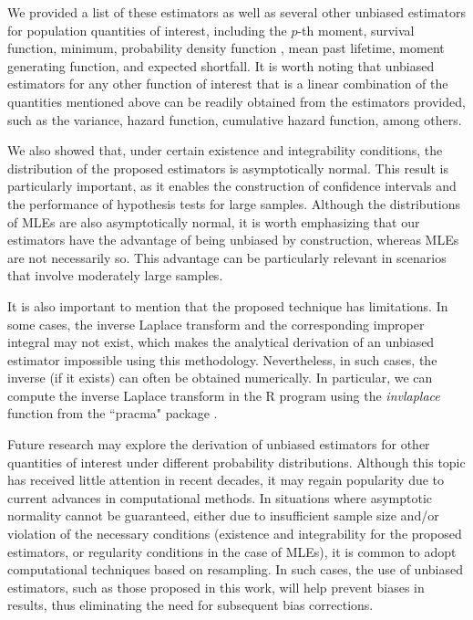 \documentclass[12pt]{article}
\theoremstyle{definition}
\begin{document}
We provided a 
list of these estimators as well as several other unbiased estimators for population quantities of interest, including the $p$-th moment, survival function, minimum, probability density function \cite[previously presented by][]{Seheult1971}, mean past lifetime, moment generating function, and expected shortfall. It is worth noting that unbiased estimators for any other function of interest that is a linear combination of the quantities mentioned above can be readily obtained from the estimators provided, such as the variance, hazard function, cumulative hazard function, among others.

We also showed that, under certain existence and integrability conditions, the distribution of the proposed estimators is asymptotically normal. This result is particularly important, as it enables the construction of confidence intervals and the performance of hypothesis tests for large samples. Although the distributions of MLEs are also asymptotically normal, it is worth emphasizing that our estimators have the advantage of being unbiased by construction, whereas MLEs are not necessarily so. This advantage can be particularly relevant in scenarios that involve moderately large samples.

It is also important to mention that the proposed technique has limitations. In some cases, the inverse Laplace transform and the corresponding improper integral may not exist, which makes the analytical derivation of an unbiased estimator impossible using this methodology. Nevertheless, in such cases, the inverse (if it exists) can often be obtained numerically. In particular, we can compute the inverse Laplace transform in the R program using the \textit{invlaplace} function from the ``pracma" package \cite{Borchers2023}.

Future research may explore the derivation of unbiased estimators for other quantities of interest under different probability distributions. Although this topic has received little attention in recent decades, it may regain popularity due to current advances in computational methods. In situations where asymptotic normality cannot be guaranteed, either due to insufficient sample size and/or violation of the necessary conditions (existence and integrability for the proposed estimators, or regularity conditions in the case of MLEs), it is common to adopt computational techniques based on resampling. In such cases, the use of unbiased estimators, such as those proposed in this work, will help prevent biases in results, thus eliminating the need for subsequent bias corrections.
\end{document}
